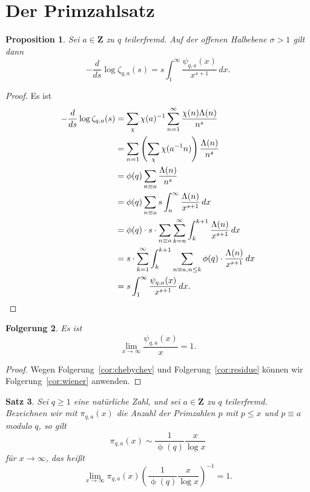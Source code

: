 \documentclass[a4paper,twoside,openright]{report}
\newtheorem{thm}{Satz}[chapter]
\newtheorem{prop}[thm]{Proposition}
\newtheorem{cor}[thm]{Folgerung}
\theoremstyle{definition}
\theoremstyle{remark}
\DeclareMathOperator{\totient}{\phi}
\begin{document}
\section{Der Primzahlsatz}

\begin{prop}
	Sei $a \in \mathbf Z$ zu $q$ teilerfremd. Auf der offenen Halbebene $\sigma > 1$ gilt dann
	\[
		- \frac{d}{ds} \log \zeta_{q, a}(s)
		= s \int_1^\infty \frac{\psi_{q, a}(x)}{x^{s + 1}} \, dx.
	\]
\end{prop}

\begin{proof}
  Es ist
  \[
    \begin{split}
      - \frac d{ds} \log \zeta_{q, a}(s)
      & = \sum_\chi \chi(a)^{-1} \sum_{n = 1}^\infty \frac{\chi(n) \Lambda(n)}{n^s} \\
      & = \sum_{n = 1} \left(\sum_{\chi} \chi(a^{-1} n)\right) \frac{\Lambda(n)}{n^s} \\
      & = \totient(q) \sum_{n \equiv a} \frac{\Lambda(n)}{n^s} \\
      & = \totient(q) \sum_{n \equiv a} s \int_n^\infty \frac{\Lambda(n)}{x^{s + 1}} \, dx \\
      & = \totient(q) \cdot s \cdot \sum_{n \equiv a} \sum_{k = n}^\infty \int_k^{k + 1} \frac{\Lambda(n)}{x^{s + 1}} \, dx \\
      & = s \cdot \sum_{k = 1}^\infty \int_k^{k + 1} \sum_{n \equiv a, n \leq k} \totient(q) \cdot \frac{\Lambda(n)}{x^{s + 1}} \, dx \\
      & = s \int_1^\infty \frac{\psi_{q, a}(x)}{x^{s + 1}} \, dx.
      \qedhere
    \end{split} 
  \]
\end{proof}

\begin{cor}
	\label{cor:convergence}
	Es ist
	\[
		\lim_{x \to \infty} \frac{\psi_{q, a}(x)}{x} = 1.
	\] 
\end{cor}

\begin{proof}
	Wegen Folgerung~\ref{cor:chebychev} und Folgerung~\ref{cor:residue} können wir Folgerung~\ref{cor:wiener}
	anwenden.
\end{proof}

\begin{thm}
  Sei $q \ge 1$ eine natürliche Zahl, und sei $a \in \mathbf Z$ zu $q$ teilerfremd.
  Bezeichnen wir mit $\pi_{q, a}(x)$ die Anzahl der Primzahlen $p$ mit $p \leq x$ und
  $p \equiv a$ modulo $q$, so gilt
  \[
    \pi_{q, a}(x) \sim \frac 1 {\totient(q)} \frac x {\log x}
  \]
  für $x \to \infty$, das heißt
  \[
    \lim_{x \to \infty} \pi_{q, a}(x) \left(\frac 1 {\totient(q)} \frac x {\log x}\right)^{-1} = 1.
  \]
\end{thm}
\end{document}
